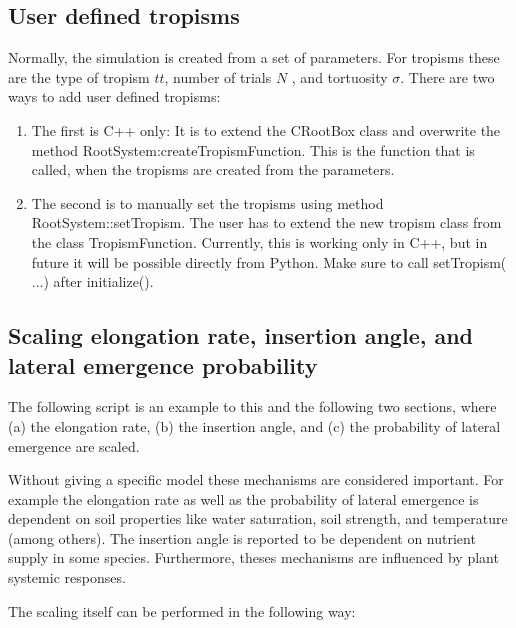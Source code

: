 \documentclass[a4paper]{article}
\begin{document}
\subsection{User defined tropisms} \label{sec:usertropism}

Normally, the simulation is created from a set of parameters. For tropisms these are the type of tropism $tt$, number of trials $N$ , and tortuosity $\sigma$.
There are two ways to add user defined tropisms: 

\begin{enumerate}
\item The first is C++ only: It is to extend the CRootBox class and overwrite the method RootSystem:createTropismFunction. 
This is the function that is called, when the tropisms are created from the parameters. 
\item The second is to manually set the tropisms using method RootSystem::setTropism. The user has to extend the new tropism class from the class TropismFunction. 
Currently, this is working only in C++, but in future it will be possible directly from Python. Make sure to call setTropism($\dots$) after initialize().
\end{enumerate}


\subsection{Scaling elongation rate, insertion angle, and lateral emergence probability} \label{sec:elongation}

The following script is an example to this and the following two sections, where (a) the elongation rate, (b) the insertion angle, and (c) the probability of lateral emergence are scaled.

Without giving a specific model these mechanisms are considered important. 
For example the elongation rate as well as the probability of lateral emergence is dependent on soil properties like water saturation, soil strength, and temperature (among others).  
The insertion angle is reported to be dependent on nutrient supply in some species. Furthermore, theses mechanisms are influenced by plant systemic responses.

The scaling itself can be performed in the following way:


\end{document}
